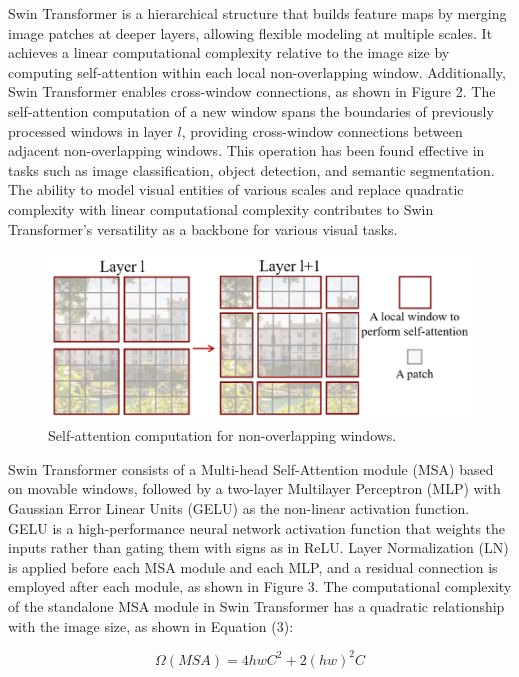 \documentclass[10pt,twocolumn,a4paper]{article}
\begin{document}
Swin Transformer\cite{ST} is a hierarchical structure that builds feature maps by merging image patches at deeper layers, allowing flexible modeling at multiple scales. It achieves a linear computational complexity relative to the image size by computing self-attention within each local non-overlapping window. Additionally, Swin Transformer enables cross-window connections, as shown in Figure 2. The self-attention computation of a new window spans the boundaries of previously processed windows in layer $l$, providing cross-window connections between adjacent non-overlapping windows. This operation has been found effective in tasks such as image classification, object detection, and semantic segmentation. The ability to model visual entities of various scales and replace quadratic complexity with linear computational complexity contributes to Swin Transformer's versatility as a backbone for various visual tasks.

\begin{figure}[htbp]   %
	\centering
	\includegraphics[width=\linewidth,scale=1.00]{Images/ST_1.png}
	\caption{Self-attention computation for non-overlapping windows.}
	\label{fig:st_1}
\end{figure}

Swin Transformer consists of a Multi-head Self-Attention module (MSA) based on movable windows, followed by a two-layer Multilayer Perceptron (MLP) with Gaussian Error Linear Units (GELU) as the non-linear activation function. GELU is a high-performance neural network activation function that weights the inputs rather than gating them with signs as in ReLU. Layer Normalization (LN) is applied before each MSA module and each MLP, and a residual connection is employed after each module, as shown in Figure 3.
The computational complexity of the standalone MSA module in Swin Transformer has a quadratic relationship with the image size, as shown in Equation (3):


\begin{equation}
  \Omega(M S A)=4 h w C^2+2(h w)^2 C
\end{equation}
\end{document}
